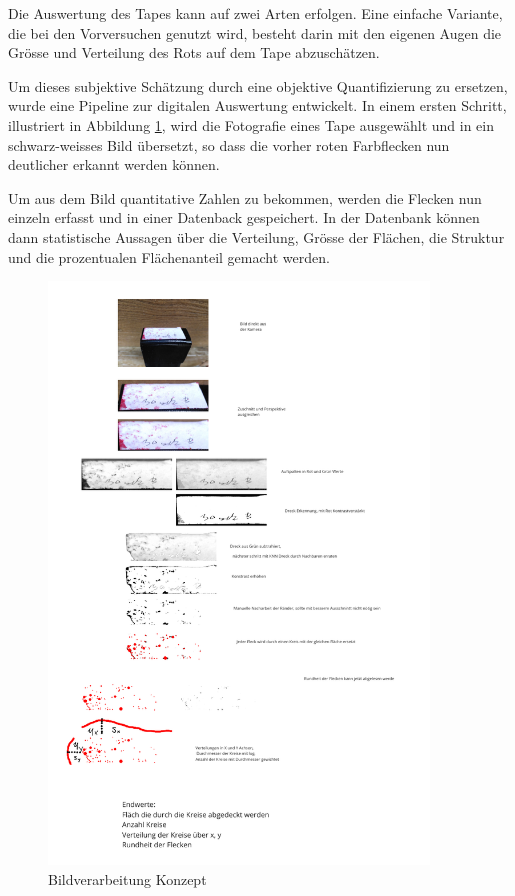 Die Auswertung des Tapes kann auf zwei Arten erfolgen. Eine einfache Variante, die bei den Vorversuchen genutzt wird, besteht darin mit den eigenen Augen die Grösse und Verteilung des Rots auf dem Tape abzuschätzen.



Um dieses subjektive Schätzung durch eine objektive Quantifizierung zu ersetzen, wurde eine Pipeline zur digitalen Auswertung entwickelt. In einem ersten Schritt, illustriert in Abbildung \ref{fig:Bildverarbeitnugskonzpet}, wird die Fotografie eines Tape ausgewählt und in ein schwarz-weisses Bild übersetzt, so dass die vorher roten Farbflecken nun deutlicher erkannt werden können.

Um aus dem Bild quantitative Zahlen zu bekommen, werden die Flecken nun einzeln erfasst und in einer Datenback gespeichert. In der Datenbank können dann statistische Aussagen über die Verteilung, Grösse der Flächen, die Struktur und die prozentualen Flächenanteil gemacht werden.



\begin{figure}
    \centering
    \includegraphics[width=0.9\textwidth]{Bilder/Screenshotfrom2024-04-0112-59-42.png}
    \caption{Bildverarbeitung Konzept}
    \label{fig:Bildverarbeitnugskonzpet}
\end{figure}

\newpage
